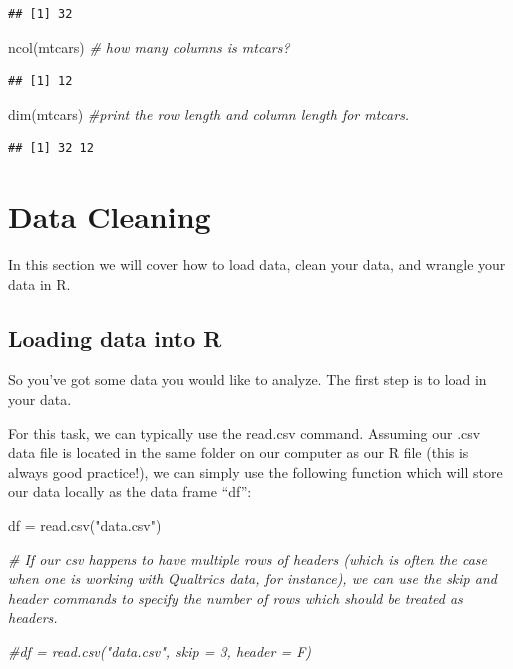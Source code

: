 \documentclass[
]{book}
\newenvironment{Shaded}{\begin{snugshade}}{\end{snugshade}}
\newcommand{\CommentTok}[1]{\textcolor[rgb]{0.56,0.35,0.01}{\textit{#1}}}
\newcommand{\FunctionTok}[1]{\textcolor[rgb]{0.00,0.00,0.00}{#1}}
\newcommand{\NormalTok}[1]{#1}
\newcommand{\OtherTok}[1]{\textcolor[rgb]{0.56,0.35,0.01}{#1}}
\newcommand{\StringTok}[1]{\textcolor[rgb]{0.31,0.60,0.02}{#1}}
\begin{document}
\begin{verbatim}
## [1] 32
\end{verbatim}

\begin{Shaded}
\begin{Highlighting}[]
\FunctionTok{ncol}\NormalTok{(mtcars) }\CommentTok{\# how many columns is mtcars?}
\end{Highlighting}
\end{Shaded}

\begin{verbatim}
## [1] 12
\end{verbatim}

\begin{Shaded}
\begin{Highlighting}[]
\FunctionTok{dim}\NormalTok{(mtcars) }\CommentTok{\#print the row length and column length for mtcars.}
\end{Highlighting}
\end{Shaded}

\begin{verbatim}
## [1] 32 12
\end{verbatim}

\hypertarget{data-cleaning}{%
\chapter{Data Cleaning}\label{data-cleaning}}

In this section we will cover how to load data, clean your data, and wrangle your data in R.

\hypertarget{loading-data-into-r}{%
\section{Loading data into R}\label{loading-data-into-r}}

So you've got some data you would like to analyze. The first step is to load in your data.

For this task, we can typically use the read.csv command. Assuming our .csv data file is located in the same folder on our computer as our R file (this is always good practice!), we can simply use the following function which will store our data locally as the data frame ``df'':

\begin{Shaded}
\begin{Highlighting}[]
\NormalTok{df }\OtherTok{=} \FunctionTok{read.csv}\NormalTok{(}\StringTok{"data.csv"}\NormalTok{)}

\CommentTok{\# If our csv happens to have multiple rows of headers (which is often the case when one is working with Qualtrics data, for instance), we can use the \textquotesingle{}skip\textquotesingle{} and \textquotesingle{}header\textquotesingle{} commands to specify the number of rows which should be treated as headers.}

\CommentTok{\#df = read.csv("data.csv", skip = 3, header = F)}
\end{Highlighting}
\end{Shaded}
\end{document}
